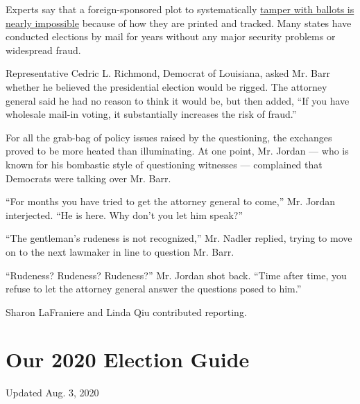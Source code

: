Experts say that a foreign-sponsored plot to systematically
\href{https://www.nytimes3xbfgragh.onion/article/mail-in-vote-fraud-ballot.html}{tamper
with ballots is nearly impossible} because of how they are printed and
tracked. Many states have conducted elections by mail for years without
any major security problems or widespread fraud.

Representative Cedric L. Richmond, Democrat of Louisiana, asked Mr. Barr
whether he believed the presidential election would be rigged. The
attorney general said he had no reason to think it would be, but then
added, ``If you have wholesale mail-in voting, it substantially
increases the risk of fraud.''

For all the grab-bag of policy issues raised by the questioning, the
exchanges proved to be more heated than illuminating. At one point, Mr.
Jordan --- who is known for his bombastic style of questioning witnesses
--- complained that Democrats were talking over Mr. Barr.

``For months you have tried to get the attorney general to come,'' Mr.
Jordan interjected. ``He is here. Why don't you let him speak?''

``The gentleman's rudeness is not recognized,'' Mr. Nadler replied,
trying to move on to the next lawmaker in line to question Mr. Barr.

``Rudeness? Rudeness? Rudeness?'' Mr. Jordan shot back. ``Time after
time, you refuse to let the attorney general answer the questions posed
to him.''

Sharon LaFraniere and Linda Qiu contributed reporting.

\hypertarget{our-2020-election-guide}{%
\section{Our 2020 Election Guide}\label{our-2020-election-guide}}

Updated Aug. 3, 2020

